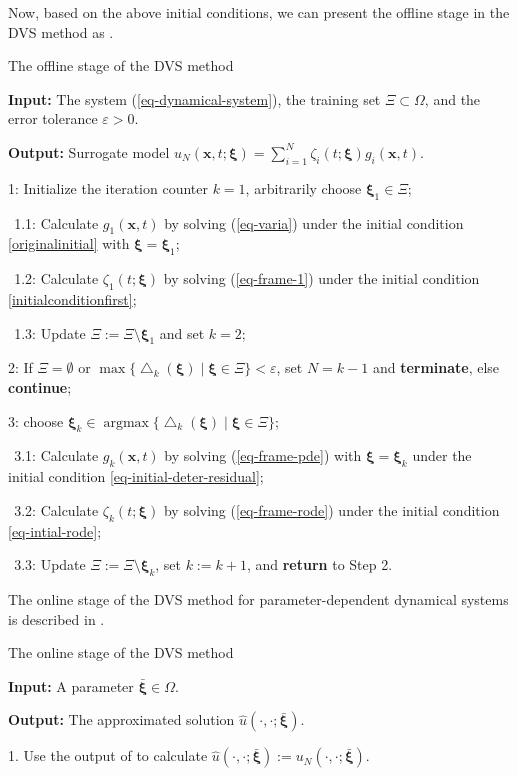 \documentclass[10pt,a4paper]{article}
\numberwithin{equation}{section}
\numberwithin{lemma}{section}
\numberwithin{example}{section}
\numberwithin{definition}{section}
\numberwithin{assumption}{section}
\numberwithin{theorem}{section}
\numberwithin{proposition}{section}
\numberwithin{corollary}{section}
\numberwithin{remark}{section}
\begin{document}
Now, based on the above initial conditions, we can present the offline stage in the DVS method as .
\begin{algorithm}[H]
\caption{The offline stage of the DVS method\label{algorithm-dvs}}
\textbf{Input:} {The system (\ref{eq-dynamical-system}), the training set $\Xi\subset \Omega$, and the error tolerance $\varepsilon>0$.}

\textbf{Output:} {Surrogate model $u_N(\bm{x},t;\bm{\xi})= \sum_{i=1}^{N}\zeta_i(t;\bm{\xi})g_i(\bm{x},t)$.} 

1: Initialize the iteration counter $k=1$, arbitrarily choose $\bm{\xi}_1\in \Xi$;

$~~$1.1: Calculate $g_1(\bm{x},t)$ by solving (\ref{eq-varia})
under the initial condition \eqref{originalinitial} with $\bm{\xi}=\bm{\xi}_1$;
 

$~~$1.2: Calculate $\zeta_1(t;\bm{\xi})$ by solving (\ref{eq-frame-1}) under the initial condition  \eqref{initialconditionfirst};

$~~$1.3: Update $\Xi:=\Xi \textbf{\textbackslash} \bm{\xi}_1$ and set $k=2$;

2: If $\Xi=\emptyset$ or $\max\{\bigtriangleup_k(\bm{\xi})\mid {\bm{\xi}\in\Xi} \}<\varepsilon$, set $N=k-1$ and \textbf{terminate}, else \textbf{continue};

3: choose $\bm{\xi}_k \in\mathop{\text{argmax}}\{\bigtriangleup_k(\bm{\xi})\mid \bm{\xi}\in\Xi\}$;



$~~$3.1: Calculate $g_k(\bm{x},t)$ by solving (\ref{eq-frame-pde}) with $\bm{\xi}=\bm{\xi}_k$ under the initial condition \eqref{eq-initial-deter-residual};

$~~$3.2: Calculate $\zeta_k(t;\bm{\xi})$ by solving (\ref{eq-frame-rode}) under the initial condition   \eqref{eq-intial-rode}; 

$~~$3.3: Update $\Xi:=\Xi \textbf{\textbackslash} \bm{\xi}_k$, set $k:=k+1$, and \textbf{return} to Step 2.
\end{algorithm}
The online stage of the DVS method for parameter-dependent dynamical systems is described in . 
\begin{algorithm}[H]
\caption{The online stage of the DVS method \label{algorithm-dvs-online}}
\textbf{Input:} {A parameter $\bm{\bar\xi}\in\Omega$.}

\textbf{Output:} {The approximated solution ${\hat u}(\cdot, \cdot ; \bm{\bar\xi})$.}


1. Use the output of  to calculate ${\hat u}(\cdot,\cdot ;\bm{\bar\xi}):=u_N(\cdot,\cdot ; \bm{\bar\xi} )$.
\end{algorithm}
\end{document}

